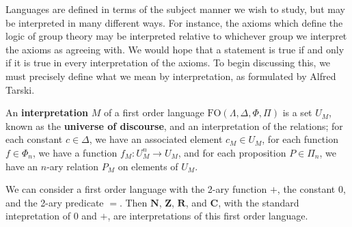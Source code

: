 Languages are defined in terms of the subject manner we wish to study, but may be interpreted in many different ways. For instance, the axioms which define the logic of group theory may be interpreted relative to whichever group we interpret the axioms as agreeing with. We would hope that a statement is true if and only if it is true in every interpretation of the axioms. To begin discussing this, we must precisely define what we mean by interpretation, as formulated by Alfred Tarski.

An {\bf interpretation} $M$ of a first order language $\text{FO}(\Lambda, \Delta, \Phi, \Pi)$ is a set $U_M$, known as the {\bf universe of discourse}, and an interpretation of the relations; for each constant $c \in \Delta$, we have an associated element $c_M \in U_M$, for each function $f \in \Phi_n$, we have a function $f_M: U_M^n \to U_M$, and for each proposition $P \in \Pi_n$, we have an $n$-ary relation $P_M$ on elements of $U_M$.

\begin{example}
    We can consider a first order language with the 2-ary function $+$, the constant $0$, and the 2-ary predicate $=$. Then $\mathbf{N}$, $\mathbf{Z}$, $\mathbf{R}$, and $\mathbf{C}$, with the standard intepretation of $0$ and $+$, are interpretations of this first order language.
\end{example}

